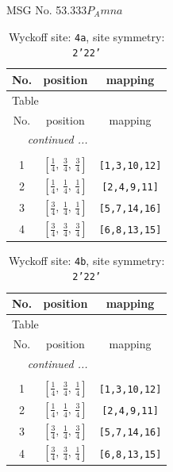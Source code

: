 \documentclass[fleqn,8pt]{jsarticle}
\begin{document}
\setcounter{MaxMatrixCols}{32}

\renewcommand{\tablename}{Table~}
\renewcommand{\figurename}{Figure~}
\begin{center}
\LARGE
MSG No. 53.333\quad$P_{A}mna$
\end{center}
\renewcommand{\arraystretch}{1.2}
\begin{longtable}{ccc}
\caption{Wyckoff site: {\tt 4a}, site symmetry: {\tt 2'22'}}
 \\
 \hline \hline
No. & position & mapping \\ \hline \endfirsthead

\multicolumn{2}{l}{\tablename\ \thetable{}} \\
 \hline \hline
No. & position & mapping \\ \hline \endhead

 \hline \hline
\multicolumn{2}{r}{\footnotesize\it continued ...} \\ \endfoot

 \hline \hline
\multicolumn{2}{r}{} \\ \endlastfoot

1 & $\left[ \frac{1}{4},\, \frac{3}{4},\, \frac{3}{4} \right]$ & {\tt [1,3,10,12]} \\ \hline
2 & $\left[ \frac{1}{4},\, \frac{1}{4},\, \frac{1}{4} \right]$ & {\tt [2,4,9,11]} \\ \hline
3 & $\left[ \frac{3}{4},\, \frac{1}{4},\, \frac{1}{4} \right]$ & {\tt [5,7,14,16]} \\ \hline
4 & $\left[ \frac{3}{4},\, \frac{3}{4},\, \frac{3}{4} \right]$ & {\tt [6,8,13,15]} \\
\end{longtable}
\renewcommand{\arraystretch}{1.2}
\begin{longtable}{ccc}
\caption{Wyckoff site: {\tt 4b}, site symmetry: {\tt 2'22'}}
 \\
 \hline \hline
No. & position & mapping \\ \hline \endfirsthead

\multicolumn{2}{l}{\tablename\ \thetable{}} \\
 \hline \hline
No. & position & mapping \\ \hline \endhead

 \hline \hline
\multicolumn{2}{r}{\footnotesize\it continued ...} \\ \endfoot

 \hline \hline
\multicolumn{2}{r}{} \\ \endlastfoot

1 & $\left[ \frac{1}{4},\, \frac{3}{4},\, \frac{1}{4} \right]$ & {\tt [1,3,10,12]} \\ \hline
2 & $\left[ \frac{1}{4},\, \frac{1}{4},\, \frac{3}{4} \right]$ & {\tt [2,4,9,11]} \\ \hline
3 & $\left[ \frac{3}{4},\, \frac{1}{4},\, \frac{3}{4} \right]$ & {\tt [5,7,14,16]} \\ \hline
4 & $\left[ \frac{3}{4},\, \frac{3}{4},\, \frac{1}{4} \right]$ & {\tt [6,8,13,15]} \\
\end{longtable}
\end{document}
